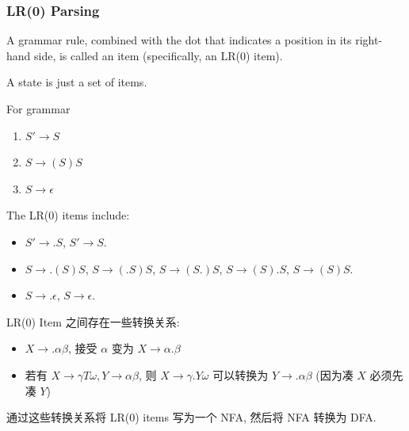     



\subsubsection{LR(0) Parsing}
\begin{definition}[LR(0) item]
    A grammar rule, combined with the dot that indicates a position in its right-hand side, is called an item (specifically, an LR(0) item).
\end{definition}

A state is just a set of items.

\begin{example}\label{exp:lr0}
    For grammar
    \begin{enumerate}
        \item $S'\to S$
        \item $S\to (S)S$
        \item $S\to \epsilon$
    \end{enumerate}
    The LR(0) items include:
    \begin{itemize}
        \item $S'\to .S$, $S'\to S.$
        \item $S\to .(S)S$, $S\to (.S)S$, $S\to (S.)S$, $S\to (S).S$, $S\to (S)S.$
        \item $S\to .\epsilon$, $S\to \epsilon.$
    \end{itemize}
\end{example}

LR(0) Item  之间存在一些转换关系:
\begin{itemize}
    \item $X\to .\alpha\beta$, 接受 $\alpha$ 变为 $X\to \alpha . \beta$
    \item 若有 $X\to \gamma T\omega, Y\to \alpha\beta$, 则 $X\to \gamma . Y \omega$ 可以转换为 $Y\to .\alpha \beta$ (因为凑 $X$ 必须先凑 $Y$)
\end{itemize}
通过这些转换关系将 LR(0) items 写为一个 NFA, 然后将 NFA 转换为 DFA. 

